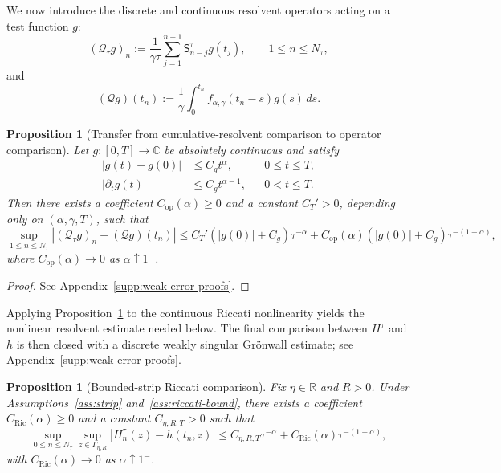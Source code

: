 \documentclass[letterpaper]{article}
\numberwithin{equation}{section}
\newtheorem{proposition}[theorem]{Proposition}
\theoremstyle{definition}
\theoremstyle{remark}
\newcommand{\R}{\mathbb{R}}
\newcommand{\C}{\mathbb{C}}
\begin{document}
We now introduce the discrete and continuous resolvent operators acting on a test
function $g$:
\[
  (\mathcal Q_\tau g)_n
  :=
  \frac{1}{\gamma\tau}\sum_{j=1}^{n-1}\mathsf{S}_{n-j}^\tau g(t_j),
  \qquad 1\le n\le N_\tau,
\]
and
\[
  (\mathcal Q g)(t_n)
  :=
  \frac1\gamma\int_0^{t_n}f_{\alpha,\gamma}(t_n-s)g(s)\,ds.
\]

\begin{proposition}[Transfer from cumulative-resolvent comparison to operator comparison]
\label{prop:resolvent-transfer-from-cumulative}
Let $g:[0,T]\to\C$ be absolutely continuous and satisfy
\begin{align}
  |g(t)-g(0)| &\le C_g t^\alpha,
  &&0\le t\le T,\label{eq:g-assump-1}\\
  |\partial_t g(t)| &\le C_g t^{\alpha-1},
  &&0<t\le T.\label{eq:g-assump-2}
\end{align}
Then there exists a coefficient $C_{\mathrm{op}}(\alpha)\ge0$ and a constant
$C_T'>0$, depending only on $(\alpha,\gamma,T)$, such that
\begin{equation}\label{eq:resolvent-operator-compare-main}
  \sup_{1\le n\le N_\tau}
  |(\mathcal Q_\tau g)_n-(\mathcal Q g)(t_n)|
  \le
  C_T'(|g(0)|+C_g)\tau^{-\alpha}
  +
  C_{\mathrm{op}}(\alpha)(|g(0)|+C_g)\tau^{-(1-\alpha)},
\end{equation}
where $C_{\mathrm{op}}(\alpha)\to0$ as $\alpha\uparrow1^-$.
\end{proposition}

\begin{proof}
See Appendix~\ref{supp:weak-error-proofs}.
\end{proof}

Applying Proposition~\ref{prop:resolvent-transfer-from-cumulative} to the
continuous Riccati nonlinearity yields the nonlinear resolvent estimate needed
below. The final comparison between $H^\tau$ and $h$ is then closed with a
discrete weakly singular Gr\"onwall estimate; see Appendix~\ref{supp:weak-error-proofs}.

\begin{proposition}[Bounded-strip Riccati comparison]
\label{prop:Volterra-rate-fixed}
{Fix $\eta\in\R$ and $R>0$. Under Assumptions~\ref{ass:strip} and~\ref{ass:riccati-bound},} there exists a coefficient $C_{\mathrm{Ric}}(\alpha)\ge0$ and a constant
$C_{\eta,R,T}>0$ such that
\begin{equation}\label{eq:Volterra-rate-fixed}
  \sup_{0\le n\le N_\tau}\sup_{z\in\Gamma_{\eta,R}}
  \left|H_n^\tau(z)-h(t_n,z)\right|
  \le
  C_{\eta,R,T}\tau^{-\alpha}+C_{\mathrm{Ric}}(\alpha)\tau^{-(1-\alpha)},
\end{equation}
with $C_{\mathrm{Ric}}(\alpha)\to0$ as $\alpha\uparrow1^-$.
\end{proposition}
\end{document}
